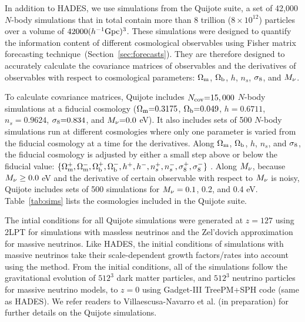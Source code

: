 In addition to HADES, we use simulations from the Quijote suite, a
set of 42,000 $N$-body simulations that in total contain more than 8 trillion 
($8\times10^{12}$) particles over a volume of $42000 (h^{-1}{\rm Gpc})^3$. 
These simulations were designed to quantify the information content of 
different cosmological observables using Fisher matrix forecasting 
technique~(Section~\ref{sec:forecasts}). They are therefore designed to accurately 
calculate the covariance matrices of observables and the derivatives of observables with 
respect to cosmological parameters: 
$\Omega_{\rm m}$, $\Omega_{\rm b}$, $h$, $n_s$, $\sigma_8$, and $M_\nu$.

To calculate covariance matrices, Quijote includes $N_{\rm cov}{=}15,000$ $N$-body 
simulations at a fiducial cosmology ($\Omega_{\rm m}{=}0.3175$, $\Omega_{\rm b}{=}0.049$, $h{=}0.6711$, 
$n_s{=}0.9624$, $\sigma_8{=}0.834$, and $M_\nu{=}0.0$ eV). It also includes sets 
of 500 $N$-body simulations run at different cosmologies where only one parameter 
is varied from the fiducial cosmology at a time for the derivatives. Along $\Omega_{\rm m}$, 
$\Omega_{\rm b}$, $h$, $n_s$, and $\sigma_8$, the fiducial cosmology is adjusted by either a 
small step above or below the fiducial value: 
$\{\Omega_{\rm m}^{+}, \Omega_{\rm m}^{-}, \Omega_{\rm b}^{+}, \Omega_{\rm b}^{-}, h^+, h^-, n_s^{+}, n_s^{-}, \sigma_8^{+}, \sigma_8^-\}$ . 
Along $M_\nu$, because $M_\nu \ge 0.0$ eV and the derivative of certain observable 
with respect to $M_\nu$ is noisy, Quijote includes sets of 500 simulations for 
$M_\nu = 0.1$, 0.2, and 0.4 eV. Table~\ref{tab:sims} lists the cosmologies included 
in the Quijote suite. 

The intial conditions for all Quijote simulations were generated at $z=127$ using 
2LPT for simulations with massless neutrinos and the Zel’dovich approximation for 
massive neutrinos. Like HADES, the initial conditions of simulations with massive
neutrinos take their scale-dependent growth factors/rates into account using the
\cite{zennaro2017a} method. From the initial conditions, all of the simulations 
follow the gravitational evolution of $512^3$ dark matter particles, and $512^3$ 
neutrino particles for massive neutrino models, to $z=0$ using {\sc Gadget-III}
TreePM+SPH code (same as HADES). 
We refer readers to Villaescusa-Navarro et al. (in preparation) for further details 
on the Quijote simulations.

